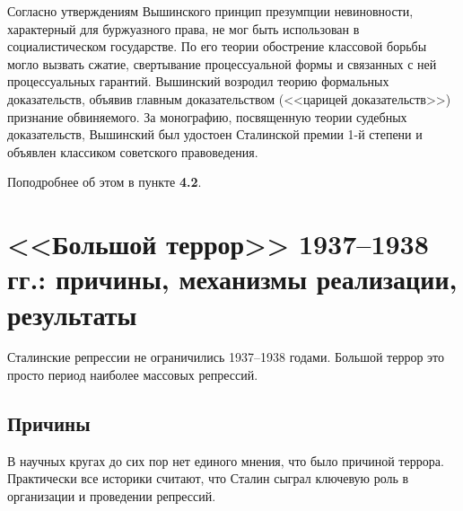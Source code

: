 \documentclass[12pt]{article}
\begin{document}
  Согласно утверждениям Вышинского принцип презумпции невиновности, характерный для буржуазного права, не мог быть использован в социалистическом государстве.
  По его теории обострение классовой борьбы могло вызвать сжатие, свертывание процессуальной формы и связанных с ней процессуальных гарантий.
  Вышинский возродил теорию формальных доказательств, объявив главным доказательством (<<царицей доказательств>>) признание обвиняемого.
  За монографию, посвященную теории судебных доказательств, Вышинский был удостоен Сталинской премии 1-й степени и объявлен классиком советского правоведения.

  Поподробнее об этом в пункте \textbf{4.2}.




  \section{<<Большой террор>> 1937--1938 гг.: причины, механизмы реализации, результаты}
  Сталинские репрессии не ограничились 1937--1938 годами.
  Большой террор это просто период наиболее массовых репрессий.
  \subsection{Причины}
  В научных кругах до сих пор нет единого мнения, что было причиной террора.
  Практически все историки считают, что Сталин сыграл ключевую роль в организации и проведении репрессий.
\end{document}
